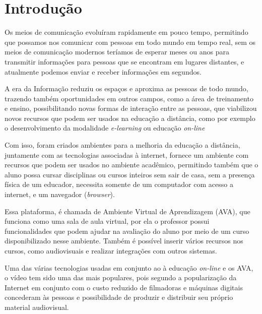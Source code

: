 \chapter{Introdução}
%
%
Os meios de comunicação evoluíram rapidamente em pouco tempo, permitindo que possamos nos comunicar com pessoas em todo mundo em tempo real, sem os meios de comunicação modernos teríamos de esperar meses ou anos para transmitir informações para pessoas que se encontram em lugares distantes, e atualmente podemos enviar e receber informações em segundos.
%
%
\par
%
%
A era da Informação reduziu os espaços e aproxima as pessoas de todo mundo, trazendo também oportunidades em outros campos, como a área de treinamento e ensino, possibilitando novas formas de interação entre as pessoas, que viabilizou novos recursos que podem ser usados na educação a distância, como por exemplo o desenvolvimento da modalidade \textit{e-learning} ou educação \textit{on-line}
\par
Com isso, foram criados ambientes para a melhoria da educação a distância, juntamente com as tecnologias associadas à internet, fornece um ambiente com recursos que podem ser usados no ambiente acadêmico, permitindo também que o aluno possa cursar disciplinas ou cursos inteiros sem sair de casa, sem a presença física de um educador, necessita somente de um computador com acesso a internet, e um navegador (\textit{browser}).
\par
Essa plataforma, é chamada de Ambiente Virtual de Aprendizagem (AVA), que funciona como uma sala de aula virtual, por ela o professor possui funcionalidades que podem ajudar na avaliação do aluno por meio de um curso disponibilizado nesse ambiente. Também é possível inserir vários recursos nos cursos, como audiovisuais e realizar integrações com outros sistemas.
\par
Uma das várias tecnologias usadas em conjunto ao à educação \textit{on-line} e os AVA, o vídeo tem sido uma das mais populares, pois segundo  a popularização da Internet em conjunto com o custo reduzido de filmadoras e máquinas digitais concederam às pessoas e possibilidade de produzir e distribuir seu próprio material audiovisual.
